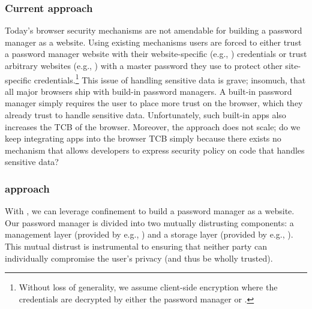 \subsubsection{Current approach}
%
Today's browser security mechanisms are not amendable for building a
password manager as a website.
%
Using existing mechanisms users are forced to either trust a password
manager website with their website-specific (e.g., )
credentials or trust arbitrary websites (e.g., ) with a
master password they use to protect other site-specific
credentials.\footnote{
  Without loss of generality, we assume client-side encryption where
  the credentials are decrypted by either the password manager or
  .
}
%
This issue of handling sensitive data is grave; insomuch, that all
major browsers ship with build-in password managers.
%
A built-in password manager simply requires the user to place more
trust on the browser, which they already trust to handle sensitive
data.
%
Unfortunately, such built-in apps also increases the TCB of the
browser.
%
Moreover, the approach does not scale; do we keep integrating apps
into the browser TCB simply because there exists no mechanism that
allows developers to express security policy on code that handles
sensitive data?

\subsubsection{\sys{} approach}
%
With \sys{}, we can leverage confinement to build a password manager
as a website.
%
Our password manager is
divided into two mutually distrusting components: a
management layer (provided by e.g., ) and a storage
layer (provided by e.g., ).
%
This mutual distrust is instrumental to ensuring that neither party
can individually compromise the user's privacy (and thus be wholly
trusted).
%

